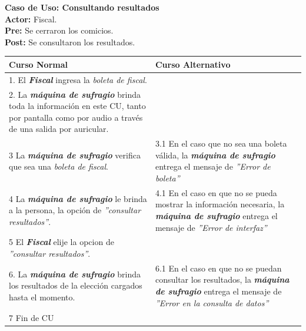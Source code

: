 \documentclass[spanish, 10pt,a4paper]{article}
\numberwithin{equation}{section} %
\begin{document}
\newpage
\noindent\textbf{Caso de Uso: Consultando resultados}\\
\textbf{Actor: } Fiscal.\\
\textbf{Pre: } Se cerraron los comicios.\\
\textbf{Post: } Se consultaron los resultados.\\
\begin{table}[H]
  \centering
\bgroup
\def\arraystretch{1.3}
  \begin{tabular}{p{9cm} | p{7cm}}
    \hline
    Curso Normal & Curso Alternativo \\
    \hline
    \hline    
    1. El \textbf{\textit{Fiscal}} ingresa la \textit{boleta de fiscal}. 
    & \\
    
    \hline
    2. La \textbf{\textit{máquina de sufragio}} brinda toda la información en este CU, tanto por pantalla como por audio a través de una salida por auricular.
    &
    \\
    
    \hline
    3 La \textbf{\textit{máquina de sufragio}} verifica que sea una \textit{boleta de fiscal}.
    & 
    3.1 En el caso que no sea una boleta válida, la \textbf{\textit{máquina de sufragio}} entrega el mensaje de \textit{''Error de boleta''}
    \\
    
    \hline
    4 La \textbf{\textit{máquina de sufragio}} le brinda a la persona, la opción de \textit{''consultar resultados''}.
    & 
    4.1 En el caso en que no se pueda mostrar la información necesaria, la \textbf{\textit{máquina de sufragio}} entrega el mensaje de \textit{''Error de interfaz''}
    \\
    
    \hline
    5 El \textbf{\textit{Fiscal}} elije la opcion de \textit{''consultar resultados''}.
    & \\
    
    \hline
    6. La \textbf{\textit{máquina de sufragio}} brinda los resultados de la elección cargados hasta el momento.
    &
    6.1 En el caso en que no se puedan consultar los resultados, la \textbf{\textit{máquina de sufragio}} entrega el mensaje de \textit{''Error en la consulta de datos''}
    \\
    
    \hline
    7 Fin de CU
    & \\
    \hline
  \end{tabular}
\egroup
\end{table}
\end{document}

